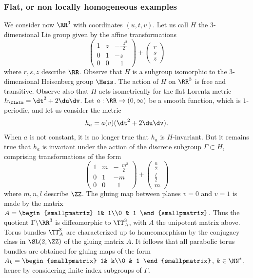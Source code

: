 \subsubsection{Flat, or non locally homogeneous examples}\label{sec.exemplesparaboliques}
We consider now $\RR^3$ with coordinates $(u,t,v)$. Let us call $H$ the $3$-dimensional Lie group given by the affine transformations
\[
\begin{pmatrix} 1& z & -\frac{\;\;z^2}{2}\\ 0 & 1 & -z \\ 0& 0 & \;\;\;1
\end{pmatrix}
+
\begin{pmatrix} r\\s\\ z
\end{pmatrix}
\]
where $r,s,z$ describe $\RR$. Observe that $H$ is a subgroup isomorphic to the $3$-dimensional Heisenberg group $\Heis$. The action of $H$ on $\RR^3$ is free and transitive. Observe also that $H$ acts isometrically for the flat Lorentz metric $h_{\flatm}=\dt^2+2\du\dv$. Let $a:\RR \to (0,\infty)$ be a smooth function, which is $1$-periodic, and let us consider the metric
\[
h_a=a(v)(\dt^2+2\du\dv).
\]
When $a$ is not constant, it is no longer true that $h_a$ is $H$-invariant. But it remains true that $h_a$ is invariant under the action of the discrete subgroup $\Gamma \subset H$, comprising transformations of the form
\[
\begin{pmatrix} 1& m & -\frac{\;\;m^2}{2}\\ 0 & 1 & -m \\ 0& 0 & \;\;1
\end{pmatrix}
+ \begin{pmatrix} \frac{n}{2}\\\frac{l}{2}\\ m
\end{pmatrix}
\]
where $m,n,l$ describe $\ZZ$. The gluing map between planes $v=0$ and $v=1$ is made by the matrix $A= 
\begin{smallpmatrix} 1& 1\\0 & 1
\end{smallpmatrix}$.
Thus the quotient $\Gamma \backslash \RR^3 $ is diffeomorphic to $\TT_A^3$, with $A$ the unipotent matrix above. Torus bundles $\TT_A^3$ are characterized up to homeomorphism by the conjugacy class in $\SL(2,\ZZ)$ of the gluing matrix $A$. It follows that all parabolic torus bundles are obtained for gluing maps of the form $A_k= \begin{smallpmatrix} 1& k\\0 & 1
\end{smallpmatrix}$, $k \in \NN^*$, hence
by considering finite index subgroups of $\Gamma$.


